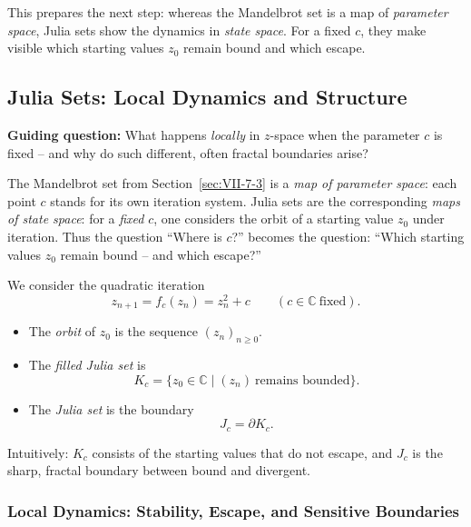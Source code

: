This prepares the next step:
whereas the Mandelbrot set is a map of \emph{parameter space},
Julia sets show the dynamics in \emph{state space}.
For a fixed \(c\), they make visible
which starting values \(z_0\) remain bound
and which escape.


\subsection{Julia Sets: Local Dynamics and Structure}
\label{sec:julia-sets}

\textbf{Guiding question:} What happens \emph{locally} in \(z\)-space when the parameter \(c\) is fixed -- and why do such different, often fractal boundaries arise?

The Mandelbrot set from Section~\ref{sec:VII-7-3} is a \emph{map of parameter space}:
each point \(c\) stands for its own iteration system.
Julia sets are the corresponding \emph{maps of state space}:
for a \emph{fixed} \(c\), one considers the orbit of a starting value \(z_0\) under iteration.
Thus the question
``Where is \(c\)?''
becomes the question:
``Which starting values \(z_0\) remain bound -- and which escape?''

\begin{MathBox}
	\label{box:iteration}
	We consider the quadratic iteration
	\[
	z_{n+1}=f_c(z_n)=z_n^2+c \qquad (c\in\mathbb{C}\ \text{fixed}).
	\]
	\begin{itemize}
		\item The \emph{orbit} of \(z_0\) is the sequence \((z_n)_{n\ge 0}\).
		\item The \emph{filled Julia set} is
		\[
		K_c=\{z_0\in\mathbb{C}\mid (z_n)\ \text{remains bounded}\}.
		\]
		\item The \emph{Julia set} is the boundary
		\[
		J_c=\partial K_c.
		\]
	\end{itemize}
	Intuitively:
	\(K_c\) consists of the starting values that do not escape,
	and \(J_c\) is the sharp, fractal boundary between bound and divergent.
\end{MathBox}

\subsubsection*{Local Dynamics: Stability, Escape, and Sensitive Boundaries}

